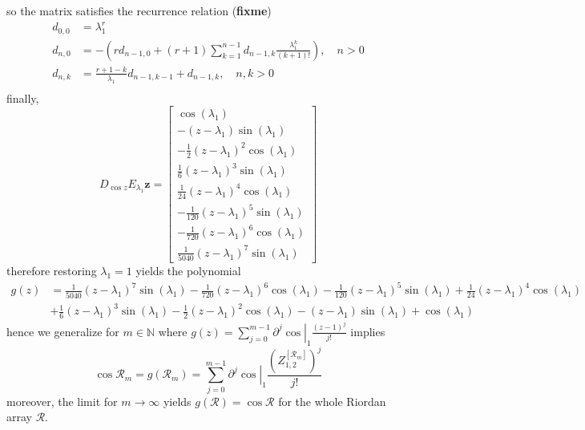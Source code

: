 so the matrix satisfies the recurrence relation (\textbf{fixme})
\begin{displaymath}
\begin{split}
d_{0,0}&=\lambda_{1}^{r}\\
d_{n,0}&=-\left(r d_{n-1, 0} + (r+1)\sum_{k=1}^{n-1}{d_{n-1, k}\frac{\lambda_{1}^{k}}{(k+1)!}}\right), \quad n>0 \\
d_{n,k}&=\frac{r+1-k}{\lambda_{1}}d_{n-1, k-1} + d_{n-1,k}, \quad n,k > 0\\
\end{split}
\end{displaymath}
finally,
\begin{displaymath}
D_{\cos{z}}E_{\lambda_{1}}\boldsymbol{z} = \left[\begin{matrix}\cos{\left (\lambda_{1} \right )}\\- \left(z - \lambda_{1}\right) \sin{\left (\lambda_{1} \right )}\\- \frac{1}{2} \left(z - \lambda_{1}\right)^{2} \cos{\left (\lambda_{1} \right )}\\\frac{1}{6} \left(z - \lambda_{1}\right)^{3} \sin{\left (\lambda_{1} \right )}\\\frac{1}{24} \left(z - \lambda_{1}\right)^{4} \cos{\left (\lambda_{1} \right )}\\- \frac{1}{120} \left(z - \lambda_{1}\right)^{5} \sin{\left (\lambda_{1} \right )}\\- \frac{1}{720} \left(z - \lambda_{1}\right)^{6} \cos{\left (\lambda_{1} \right )}\\\frac{1}{5040} \left(z - \lambda_{1}\right)^{7} \sin{\left (\lambda_{1} \right )}\end{matrix}\right]
\end{displaymath}
therefore restoring $\lambda_{1}=1$ yields the polynomial
\begin{displaymath}
\begin{split}
g{\left (z \right )} &= \frac{1}{5040} \left(z - \lambda_{1}\right)^{7} \sin{\left (\lambda_{1} \right )} - \frac{1}{720} \left(z - \lambda_{1}\right)^{6} \cos{\left (\lambda_{1} \right )} - \frac{1}{120} \left(z - \lambda_{1}\right)^{5} \sin{\left (\lambda_{1} \right )} + \frac{1}{24} \left(z - \lambda_{1}\right)^{4} \cos{\left (\lambda_{1} \right )} \\
                     &+ \frac{1}{6} \left(z - \lambda_{1}\right)^{3} \sin{\left (\lambda_{1} \right )} - \frac{1}{2} \left(z - \lambda_{1}\right)^{2} \cos{\left (\lambda_{1} \right )} - \left(z - \lambda_{1}\right) \sin{\left (\lambda_{1} \right )} + \cos{\left (\lambda_{1} \right )}
\end{split}
\end{displaymath}
hence we generalize for $m\in\mathbb{N}$ where $g(z) = \sum_{j=0}^{m-1}{\left.{\partial^{j} \cos}\right|_{1} \frac{(z-1)^{j}}{j!}}$ implies
\begin{displaymath}
\cos{\mathcal{R}_{m}} = g{\left (\mathcal{R}_{m} \right )} = \sum_{j=0}^{m-1}{\left.{\partial^{j} \cos}\right|_{1} \frac{{\left(Z_{1,2}^{\left[\mathcal{R}_{m}\right]}\right)}^{j}}{j!}}
\end{displaymath}
moreover, the limit for $m \rightarrow \infty$ yields $ g{\left (\mathcal{R}
\right )} = \cos{\mathcal{R}} $ for the whole Riordan array $\mathcal{R}$.

